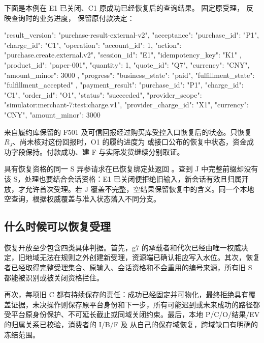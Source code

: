 
下面是本例在 E1 已关闭、C1 原成功已经恢复后的查询结果。 固定原受理， 反映查询时的业务进度， 保留原付款决定：

\begin{BookCode}
{
  "result_version": "purchase-result-external-v2",
  "acceptance": {
    "purchase_id": "P1",
    "charge_id": "C1",
    "operation": {
      "account_id": 1,
      "action": "purchase.create.external.v2",
      "session_id": "E1",
      "idempotency_key": "K1"
    },
    "product_id": "paper-001",
    "quantity": 1,
    "quote_id": "Q7",
    "currency": "CNY",
    "amount_minor": 3000
  },
  "progress": {
    "business_state": "paid",
    "fulfillment_state": "fulfillment_accepted"
  },
  "payment_result": {
    "purchase_id": "P1",
    "charge_id": "C1",
    "order_id": "O1",
    "status": "succeeded",
    "provider_scope": "simulator:merchant-7:test:charge.v1",
    "provider_charge_id": "X1",
    "currency": "CNY",
    "amount_minor": 3000
  }
}
\end{BookCode}

 来自履约库保留的 F501 及可信回报经过购买库受控入口恢复后的状态。只恢复 $R_J$、尚未核对这份回报时，O1 的履约进度为  或接口公布的恢复中状态，资金成功字段保持。付款成功、建 F 与实际发货继续分别取证。

具有恢复资格的同一 S 异参请求在已恢复绑定处返回 。查到 J 中完整前缀却没有该 S，处理也要结合会话资格：E1 已关闭便拒绝旧输入，新会话有效且归属开放，才允许首次受理。若 J 覆盖不完整，空结果保留恢复中的含义。同一个本地空查询，根据权威覆盖与准入状态落入不同分支。

\subsection*{什么时候可以恢复受理}

恢复开放至少包含四类具体判据。首先，g7 的承载者和代次已经由唯一权威决定，旧地域无法在规则之外创建新受理，资源端已确认相应写入水位。其次，恢复者已经取得完整受理集合、原输入、会话资格和不会重用的编号来源，所有旧 S 都能被识别或被关闭资格拦住。

再次，每项旧 C 都有持续保存的责任：成功已经固定并可物化，最终拒绝具有覆盖证据，未决操作则保存原平台身份和下一步，所有可能迟到或未来成功的路径都受平台原身份保护、不可延长截止或同域关闭约束。最后，本地 P/C/O/结果/EV 的归属关系已校验，消费者的 I/B/F 及  从自己的保存域恢复，跨域缺口有明确的冻结范围。

